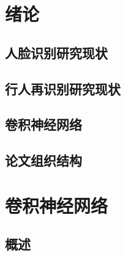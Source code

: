 \documentclass[bachelor,zhspacing]{cqu}  %
\begin{document}


\section{绪论}\label{ux7eeaux8bba}

\subsection{人脸识别研究现状}\label{ux4ebaux8138ux8bc6ux522bux7814ux7a76ux73b0ux72b6}

\subsection{行人再识别研究现状}\label{ux884cux4ebaux518dux8bc6ux522bux7814ux7a76ux73b0ux72b6}

\subsection{卷积神经网络}\label{ux5377ux79efux795eux7ecfux7f51ux7edc}

\subsection{论文组织结构}\label{ux8bbaux6587ux7ec4ux7ec7ux7ed3ux6784}

\section{卷积神经网络}\label{ux5377ux79efux795eux7ecfux7f51ux7edc-1}

\subsection{概述}\label{ux6982ux8ff0}
\end{document}
